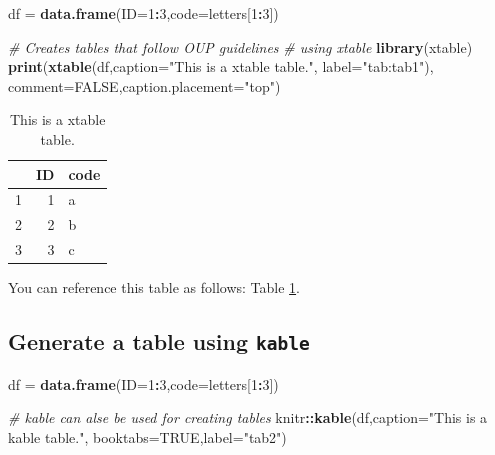 \documentclass[webpdf,large,contemporary,namedate]{oup-authoring-template}
\newenvironment{Shaded}{\begin{snugshade}}{\end{snugshade}}
\newcommand{\AttributeTok}[1]{\textcolor[rgb]{0.13,0.29,0.53}{#1}}
\newcommand{\CommentTok}[1]{\textcolor[rgb]{0.56,0.35,0.01}{\textit{#1}}}
\newcommand{\ConstantTok}[1]{\textcolor[rgb]{0.56,0.35,0.01}{#1}}
\newcommand{\DecValTok}[1]{\textcolor[rgb]{0.00,0.00,0.81}{#1}}
\newcommand{\FunctionTok}[1]{\textcolor[rgb]{0.13,0.29,0.53}{\textbf{#1}}}
\newcommand{\NormalTok}[1]{#1}
\newcommand{\OtherTok}[1]{\textcolor[rgb]{0.56,0.35,0.01}{#1}}
\newcommand{\SpecialCharTok}[1]{\textcolor[rgb]{0.81,0.36,0.00}{\textbf{#1}}}
\newcommand{\StringTok}[1]{\textcolor[rgb]{0.31,0.60,0.02}{#1}}
\theoremstyle{thmstyleone}
\theoremstyle{thmstyletwo}
\theoremstyle{thmstylethree}
\begin{document}
\begin{Shaded}
\begin{Highlighting}[]
\NormalTok{df }\OtherTok{=} \FunctionTok{data.frame}\NormalTok{(}\AttributeTok{ID=}\DecValTok{1}\SpecialCharTok{:}\DecValTok{3}\NormalTok{,}\AttributeTok{code=}\NormalTok{letters[}\DecValTok{1}\SpecialCharTok{:}\DecValTok{3}\NormalTok{])}

\CommentTok{\# Creates tables that follow OUP guidelines }
\CommentTok{\# using xtable}
\FunctionTok{library}\NormalTok{(xtable) }
\FunctionTok{print}\NormalTok{(}\FunctionTok{xtable}\NormalTok{(df,}\AttributeTok{caption=}\StringTok{"This is a xtable table."}\NormalTok{,}
             \AttributeTok{label=}\StringTok{"tab:tab1"}\NormalTok{),}
      \AttributeTok{comment=}\ConstantTok{FALSE}\NormalTok{,}\AttributeTok{caption.placement=}\StringTok{"top"}\NormalTok{)}
\end{Highlighting}
\end{Shaded}

\begin{table}[ht]
\centering
\caption{This is a xtable table.} 
\label{tab:tab1}
\begin{tabular}{rrl}
  \hline
 & ID & code \\ 
  \hline
1 &   1 & a \\ 
  2 &   2 & b \\ 
  3 &   3 & c \\ 
   \hline
\end{tabular}
\end{table}

You can reference this table as follows: Table \ref{tab:tab1}.

\hypertarget{generate-a-table-using-kable}{%
\subsection{\texorpdfstring{Generate a table using
\texttt{kable}}{Generate a table using kable}}\label{generate-a-table-using-kable}}

\begin{Shaded}
\begin{Highlighting}[]
\NormalTok{df }\OtherTok{=} \FunctionTok{data.frame}\NormalTok{(}\AttributeTok{ID=}\DecValTok{1}\SpecialCharTok{:}\DecValTok{3}\NormalTok{,}\AttributeTok{code=}\NormalTok{letters[}\DecValTok{1}\SpecialCharTok{:}\DecValTok{3}\NormalTok{])}

\CommentTok{\# kable can alse be used for creating tables}
\NormalTok{knitr}\SpecialCharTok{::}\FunctionTok{kable}\NormalTok{(df,}\AttributeTok{caption=}\StringTok{"This is a kable table."}\NormalTok{,}
             \AttributeTok{booktabs=}\ConstantTok{TRUE}\NormalTok{,}\AttributeTok{label=}\StringTok{"tab2"}\NormalTok{)}
\end{Highlighting}
\end{Shaded}
\end{document}
